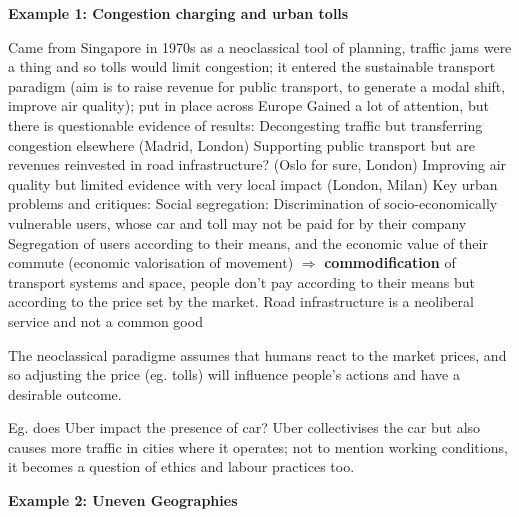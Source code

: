 \documentclass{article}
\begin{document}
\textbf{Example 1: Congestion charging and urban tolls}

\begin{outline}
	\1 Came from Singapore in 1970s as a neoclassical tool of planning, traffic jams were a thing and so tolls would limit congestion; it entered the sustainable transport paradigm (aim is to raise revenue for public transport, to generate a modal shift, improve air quality); put in place across Europe
	\1 Gained a lot of attention, but there is questionable evidence of results: 
		\2 Decongesting traffic but transferring congestion elsewhere (Madrid, London)
		\2 Supporting public transport but are revenues reinvested in road infrastructure? (Oslo for sure, London)
		\2 Improving air quality but limited evidence with very local impact (London, Milan)
	\1 Key urban problems and critiques:
		\2 Social segregation: 
			\3 Discrimination of socio-economically vulnerable users, whose car and toll may not be paid for by their company
			\3 Segregation of users according to their means, and the economic value of their commute (economic valorisation of movement)
			\3 $\Rightarrow$ \textbf{commodification} of transport systems and space, people don't pay according to their means but according to the price set by the market. Road infrastructure is a neoliberal service and not a common good
\end{outline}

The neoclassical paradigme assumes that humans react to the market prices, and so adjusting the price (eg. tolls) will influence people's actions and have a desirable outcome.

Eg. does Uber impact the presence of car? Uber collectivises the car but also causes more traffic in cities where it operates; not to mention working conditions, it becomes a question of ethics and labour practices too.

\textbf{Example 2: Uneven Geographies}
\end{document}
